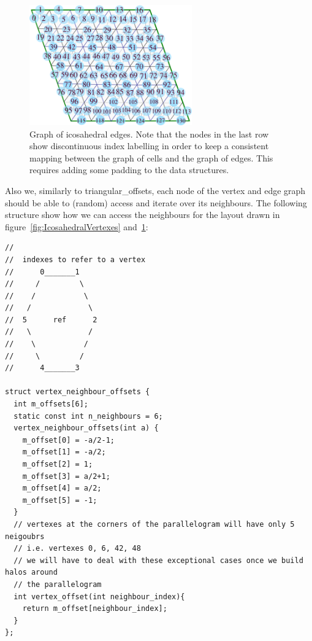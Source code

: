 \documentclass{book}
\begin{document}
\begin{figure}[htb!]
	\begin{center}
		\includegraphics[width=7cm]{fig/IcosahedralGridEdges.png}
	\caption{Graph of icosahedral edges. Note that the nodes in the last row
		show discontinuous index labelling in order to keep a consistent mapping between the graph of cells and the graph of edges. This requires adding some padding to the data structures.}
	\label{fig:IcosahedralEdges}
	\end{center}
\end{figure}

Also we, similarly to triangular\_offsets, each node of the vertex and edge graph should be able to (random) access and iterate over its neighbours. 
The following structure show how we can access the neighbours for the layout 
drawn in figure~\ref{fig:IcosahedralVertexes} and~\ref{fig:IcosahedralEdges}:

\begin{verbatim}
//
//  indexes to refer to a vertex
//      0_______1
//     /         \
//    /           \
//   /             \
//  5      ref      2
//   \             /
//    \           /
//     \         /
//      4_______3 

struct vertex_neighbour_offsets {
  int m_offsets[6];
  static const int n_neighbours = 6;
  vertex_neighbour_offsets(int a) {
    m_offset[0] = -a/2-1;
    m_offset[1] = -a/2;
    m_offset[2] = 1;
    m_offset[3] = a/2+1;
    m_offset[4] = a/2;
    m_offset[5] = -1;
  }
  // vertexes at the corners of the parallelogram will have only 5 neigoubrs
  // i.e. vertexes 0, 6, 42, 48 
  // we will have to deal with these exceptional cases once we build halos around
  // the parallelogram
  int vertex_offset(int neighbour_index){
    return m_offset[neighbour_index];
  }
};
\end{verbatim}
\end{document}

